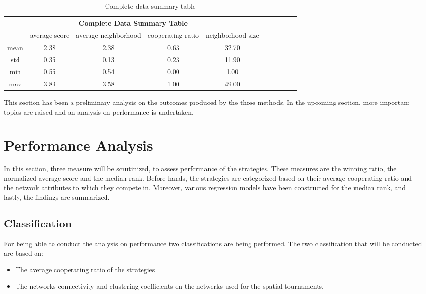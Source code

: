 \begin{table}[!hbtp]
	\centering
	\begin{adjustbox}{width=0.8\textwidth}
		\small
		\begin{tabular}{cccccccccc}
				\toprule
			\multicolumn{5}{|c|}{Complete Data Summary Table}                                      \\ \hline
			     & average score & average neighborhood & cooperating ratio & neighborhood size \\ \hline
			mean & 2.38          & 2.38                 & 0.63              & 32.70             \\ \hline
			std  & 0.35          & 0.13                 & 0.23              & 11.90             \\ \hline
			min  & 0.55          & 0.54                 & 0.00              & 1.00              \\ \hline
			max  & 3.89          & 3.58                 & 1.00              & 49.00             \\ \bottomrule
		\end{tabular}
	\end{adjustbox}
	\caption{Complete data summary table}
	\label{table:summary-complete-data}
\end{table}

This section has been a preliminary analysis on the outcomes produced by
the three methods. In the upcoming section, more important topics are
raised and an analysis on performance is undertaken.

\section{Performance Analysis}
\label{performance-analysis}
In this section, three measure will be scrutinized, to assess performance of the
strategies. These measures are the winning ratio, the normalized average score
and the median rank. Before hands, the strategies are categorized based on their
average cooperating ratio and the network attributes to which they compete in. Moreover,
various regression models have been constructed for the median rank, and lastly,
the findings are summarized.

\subsection{Classification}
\label{sub:classification}
For being able to conduct the analysis on performance two classifications are
being performed. The two classification that will be conducted are based on:
\begin{itemize}
	\item The average cooperating ratio of the strategies
	\item The networks connectivity and clustering coefficients on the networks
	      used for the spatial tournaments.
\end{itemize}

